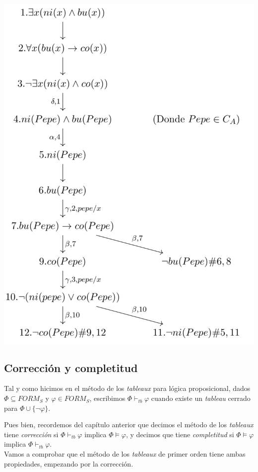 \begin{example}
\begin{center}
\includegraphics[scale = 0.44]{figures/tableau4.png}
\end{center}
\end{example}


\subsection{Corrección y completitud}

Tal y como hicimos en el método de los \textit{tableaux} para lógica proposicional, dados $\Phi \subseteq FORM_S$ y $\varphi \in FORM_S$, escribimos $\Phi \vdash_{tb} \varphi$ cuando existe un \textit{tableau} cerrado para $\Phi \cup \{\neg \varphi\}$.

Pues bien, recordemos del capítulo anterior que decimos el método de los \textit{tableaux} tiene \textit{corrección} si $\Phi \vdash_{tb} \varphi$ implica $\Phi \vDash \varphi$, y decimos que tiene \textit{completitud} si $\Phi \vDash \varphi$ implica $\Phi \vdash_{tb} \varphi$.\\
Vamos a comprobar que el método de los \textit{tableaux} de primer orden tiene ambas propiedades, empezando por la corrección.

